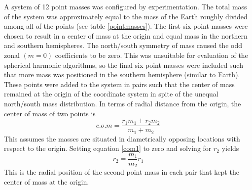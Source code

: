A system of 12 point masses was configured by experimentation. The 
total mass of the system was approximately equal to the mass of the 
Earth roughly divided among all of the points (see table 
\ref{pointmasses}).  The first six point masses were chosen to 
result in a center of mass at the origin and equal mass in the 
northern and southern hemispheres. The north/south symmetry of mass 
caused the odd zonal $(m=0)$ coefficients to be zero. This was 
unsuitable for evaluation of the spherical harmonic algorithms, so 
the final six point masses were included such that more mass was 
positioned in the southern hemisphere (similar to Earth). These 
points were added to the system in pairs such that the center of 
mass remained at the origin of the coordinate system in spite of the 
unequal north/south mass distribution. In terms of radial distance 
from the origin, the center of mass of two points is
\begin{equation}\label{com1}
c.o.m=\frac{r_1m_1+r_2m_2}{m_1+m_2}
\end{equation}
This assumes the masses are situated in diametrically opposing 
locations with respect to the origin. Setting equation \ref{com1} to 
zero and solving for $r_2$ yields
\begin{equation}\label{com2}
r_2=\frac{m_1}{m_2}r_1
\end{equation}
This is the radial position of the second point mass in each pair 
that kept the center of mass at the origin.

